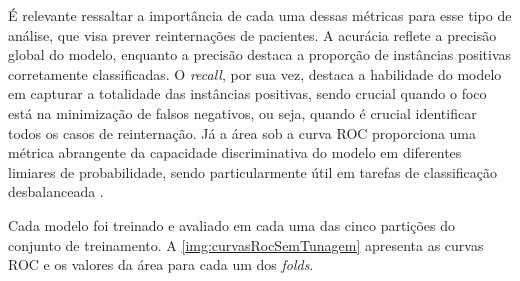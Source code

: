 É relevante ressaltar a importância de cada uma dessas métricas para esse tipo de análise, que visa prever reinternações de pacientes. A acurácia reflete a precisão global do modelo, enquanto a precisão destaca a proporção de instâncias positivas corretamente classificadas. O \textit{recall}, por sua vez, destaca a habilidade do modelo em capturar a totalidade das instâncias positivas, sendo crucial quando o foco está na minimização de falsos negativos, ou seja, quando é crucial identificar todos os casos de reinternação. Já a área sob a curva ROC proporciona uma métrica abrangente da capacidade discriminativa do modelo em diferentes limiares de probabilidade, sendo particularmente útil em tarefas de classificação desbalanceada \cite{geron2022hands}.

Cada modelo foi treinado e avaliado em cada uma das cinco partições do conjunto de treinamento. A \autoref{img:curvasRocSemTunagem} apresenta as curvas ROC e os valores da área para cada um dos \textit{folds}.

